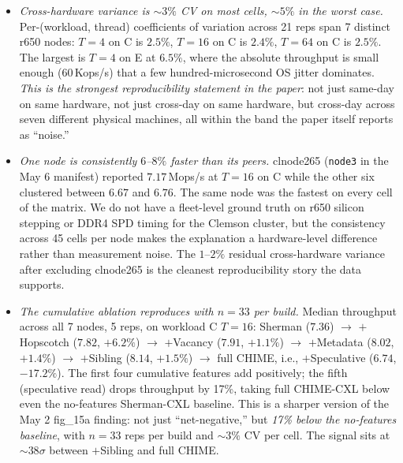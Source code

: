 \documentclass[11pt,a4paper]{article}
\begin{document}
\begin{itemize}[nosep]
    \item \emph{Cross-hardware variance is $\sim 3\%$ CV on most cells, $\sim 5\%$ in the worst case.} Per-(workload, thread) coefficients of variation across 21 reps span 7 distinct r650 nodes: $T=4$ on C is $2.5\%$, $T=16$ on C is $2.4\%$, $T=64$ on C is $2.5\%$. The largest is $T=4$ on E at $6.5\%$, where the absolute throughput is small enough ($60$\,Kops/s) that a few hundred-microsecond OS jitter dominates. \emph{This is the strongest reproducibility statement in the paper}: not just same-day on same hardware, not just cross-day on same hardware, but cross-day across seven different physical machines, all within the band the paper itself reports as ``noise.''
    \item \emph{One node is consistently $6$--$8\%$ faster than its peers.} clnode265 (\texttt{node3} in the May 6 manifest) reported $7.17$\,Mops/s at $T=16$ on C while the other six clustered between $6.67$ and $6.76$. The same node was the fastest on every cell of the matrix. We do not have a fleet-level ground truth on r650 silicon stepping or DDR4 SPD timing for the Clemson cluster, but the consistency across 45 cells per node makes the explanation a hardware-level difference rather than measurement noise. The $1$--$2\%$ residual cross-hardware variance after excluding clnode265 is the cleanest reproducibility story the data supports.
    \item \emph{The cumulative ablation reproduces with $n=33$ per build.} Median throughput across all 7 nodes, 5 reps, on workload C $T=16$: Sherman ($7.36$) $\to$ $+$Hopscotch ($7.82$, $+6.2\%$) $\to$ $+$Vacancy ($7.91$, $+1.1\%$) $\to$ $+$Metadata ($8.02$, $+1.4\%$) $\to$ $+$Sibling ($8.14$, $+1.5\%$) $\to$ full CHIME, i.e., $+$Speculative ($\mathbf{6.74}$, $\mathbf{-17.2\%}$). The first four cumulative features add positively; the fifth (speculative read) drops throughput by 17\%, taking full CHIME-CXL below even the no-features Sherman-CXL baseline. This is a sharper version of the May 2 fig\_15a finding: not just ``net-negative,'' but \emph{17\% below the no-features baseline}, with $n=33$ reps per build and $\sim 3\%$ CV per cell. The signal sits at $\sim 38\sigma$ between $+$Sibling and full CHIME.

\end{itemize}
\end{document}
